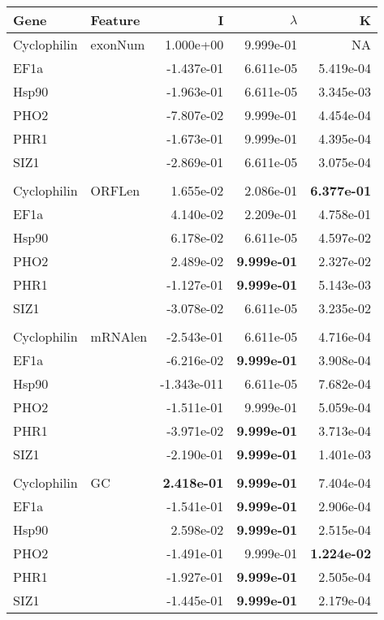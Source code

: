 \documentclass[varwidth,convert]{standalone}
\begin{document}
\begin{tabular}{llrrr}
\toprule
Gene & Feature & I  & $\lambda$  & K  \\ 
\midrule
Cyclophilin & exonNum &  1.000e+00  & 9.999e-01 &        NA \\ 
EF1a &  & -1.437e-01 & 6.611e-05  & 5.419e-04  \\ 
Hsp90 & & -1.963e-01  & 6.611e-05  & 3.345e-03  \\ 
PHO2 &  & -7.807e-02  & 9.999e-01  & 4.454e-04  \\ 
PHR1 &  & -1.673e-01  & 9.999e-01  & 4.395e-04  \\ 
SIZ1 &  & -2.869e-01  & 6.611e-05  & 3.075e-04  \\ 
\\
Cyclophilin & ORFLen &  1.655e-02 & 2.086e-01  & \textbf{6.377e-01}  \\ 
EF1a &  &  4.140e-02  & 2.209e-01  & 4.758e-01  \\ 
Hsp90 & &  6.178e-02  & 6.611e-05  & 4.597e-02  \\ 
PHO2 &  &  2.489e-02  & \textbf{9.999e-01}  & 2.327e-02  \\ 
PHR1 &  & -1.127e-01  & \textbf{9.999e-01}  & 5.143e-03  \\ 
SIZ1 &  & -3.078e-02  & 6.611e-05  & 3.235e-02  \\ 
\\
Cyclophilin & mRNAlen & -2.543e-01  & 6.611e-05  & 4.716e-04 \\ 
EF1a &  & -6.216e-02  & \textbf{9.999e-01}  & 3.908e-04  \\ 
Hsp90 & & -1.343e-011& 6.611e-05  & 7.682e-04  \\ 
PHO2 &  & -1.511e-01  & 9.999e-01  & 5.059e-04  \\ 
PHR1 &  & -3.971e-02  & \textbf{9.999e-01}  & 3.713e-04  \\ 
SIZ1 &  & -2.190e-01  & \textbf{9.999e-01}  & 1.401e-03  \\ 
\\
Cyclophilin & GC &  \textbf{2.418e-01} &  \textbf{9.999e-01} &  7.404e-04  \\ 
EF1a & & -1.541e-01  & \textbf{9.999e-01}  & 2.906e-04  \\ 
Hsp90 &  &  2.598e-02  & \textbf{9.999e-01} &  2.515e-04  \\ 
PHO2 &  & -1.491e-01  & 9.999e-01 & \textbf{1.224e-02}  \\ 
PHR1 &  & -1.927e-01  & \textbf{9.999e-01} & 2.505e-04  \\ 
SIZ1 &  & -1.445e-01  & \textbf{9.999e-01} & 2.179e-04  \\ 

\end{tabular}
\end{document}
